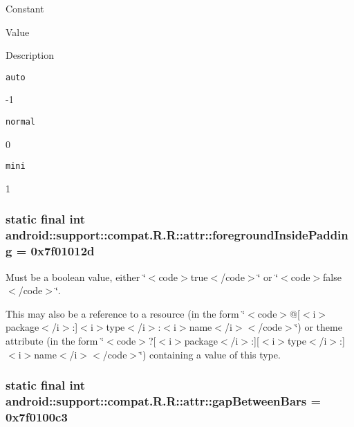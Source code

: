 Constant

Value

Description 

{\tt auto}

-1

{\tt normal}

0

{\tt mini}

1\hypertarget{classandroid_1_1support_1_1compat_1_1_r_1_1attr_c37311b6828211b898065a649a72b780}{
\subsubsection[{foregroundInsidePadding}]{\setlength{\rightskip}{0pt plus 5cm}static final int android::support::compat.R.R::attr::foregroundInsidePadding = 0x7f01012d}}
\label{classandroid_1_1support_1_1compat_1_1_r_1_1attr_c37311b6828211b898065a649a72b780}


Must be a boolean value, either \char`\"{}$<$code$>$true$<$/code$>$\char`\"{} or \char`\"{}$<$code$>$false$<$/code$>$\char`\"{}. 

This may also be a reference to a resource (in the form \char`\"{}$<$code$>$@\mbox{[}$<$i$>$package$<$/i$>$:\mbox{]}$<$i$>$type$<$/i$>$:$<$i$>$name$<$/i$>$$<$/code$>$\char`\"{}) or theme attribute (in the form \char`\"{}$<$code$>$?\mbox{[}$<$i$>$package$<$/i$>$:\mbox{]}\mbox{[}$<$i$>$type$<$/i$>$:\mbox{]}$<$i$>$name$<$/i$>$$<$/code$>$\char`\"{}) containing a value of this type. \hypertarget{classandroid_1_1support_1_1compat_1_1_r_1_1attr_b992a7b82b77906ef2a4c56893bb101d}{
\subsubsection[{gapBetweenBars}]{\setlength{\rightskip}{0pt plus 5cm}static final int android::support::compat.R.R::attr::gapBetweenBars = 0x7f0100c3}}
\label{classandroid_1_1support_1_1compat_1_1_r_1_1attr_b992a7b82b77906ef2a4c56893bb101d}


